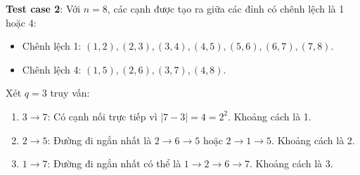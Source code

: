 \documentclass[11pt]{article}
\begin{document}
\textbf{Test case 2}: Với $n = 8$, các cạnh được tạo ra giữa các đỉnh có chênh lệch là 1 hoặc 4:
\begin{itemize}
    \item Chênh lệch 1: $(1, 2), (2, 3), (3, 4), (4, 5), (5, 6), (6, 7), (7, 8)$.
    \item Chênh lệch 4: $(1, 5), (2, 6), (3, 7), (4, 8)$.
\end{itemize}
Xét $q=3$ truy vấn:
\begin{enumerate}
    \item $3 \to 7$: Có cạnh nối trực tiếp vì $|7 - 3| = 4 = 2^2$. Khoảng cách là 1.
    \item $2 \to 5$: Đường đi ngắn nhất là $2 \to 6 \to 5$ hoặc $2 \to 1 \to 5$. Khoảng cách là 2.
    \item $1 \to 7$: Đường đi ngắn nhất có thể là $1 \to 2 \to 6 \to 7$. Khoảng cách là 3.
\end{enumerate}

\newpage
\end{document}

